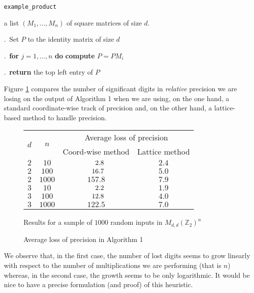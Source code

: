 \documentclass{sig-alternate}
\newcommand{\Z}{\mathbb Z}
\begin{document}
\noindent\hrulefill

 {\tt example\_product}

 a list $(M_1, \ldots, M_n)$ of square matrices
of size $d$.

\smallskip

.\ Set $P$ to the identity matrix of size $d$

.\ {\bf for} $j=1,\dots,n$ {\bf do} {\bf compute} $P = P M_i$

.\ {\bf return} the top left entry of $P$

\vspace{-1ex}\noindent\hrulefill

\medskip

\noindent
Figure \ref{fig:mulmatrix} compares the number of significant digits in 
\emph{relative} precision we are losing on the output of Algorithm 1 
when we are using, on the one hand, a standard coordinate-wise track of 
precision and, on the other hand, a lattice-based method to handle 
precision.
%
\begin{figure}
\begin{center}
\renewcommand{\arraystretch}{1.2}
\begin{tabular}{|c|c|c|c|}
\hline
\multirow{2}{*}{\hspace{0.2cm}$d$\hspace{0.2cm}} & 
\multirow{2}{*}{\hspace{0.2cm}$n$\hspace{0.2cm}} & 
\multicolumn{2}{|c|}{Average loss of precision} \\
\cline{3-4}
& & Coord-wise method & Lattice method \\
\hline 
$2$ & $10$ & $\hphantom{00}2.8$ & $2.4$ \\
$2$ & $100$ & $\hphantom{0}16.7$ & $5.0$ \\
$2$ & $1000$ & $157.8$ & $7.9$ \\
\hline
$3$ & $10$ & $\hphantom{00}2.2$ & $1.9$ \\
$3$ & $100$ & $\hphantom{0}12.8$ & $4.0$ \\
$3$ & $1000$ & $122.5$ & $7.0$ \\
\hline
\end{tabular}

\smallskip

{\small
Results for a sample of $1000$ random inputs in $M_{d,d}(\Z_2)^n$}
\end{center}
\renewcommand{\arraystretch}{1}

\vspace{-0.3cm}

\caption{Average loss of precision in Algorithm 1}
\label{fig:mulmatrix}
\end{figure}
%
We observe that, in the first case, the number of lost digits seems to 
grow linearly with respect to the number of multiplications we are 
performing (that is $n$) whereas, in the second case, the growth seems 
to be only logarithmic. It would be nice to have a precise formulation 
(and proof) of this heuristic.
\end{document}
